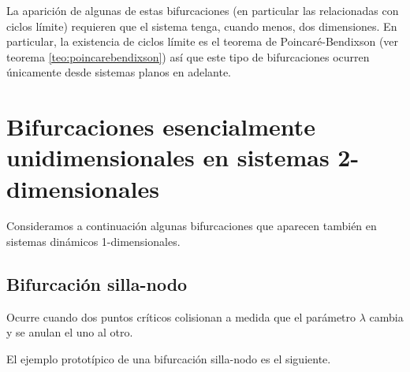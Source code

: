 La aparición de algunas de estas bifurcaciones (en particular las relacionadas con ciclos límite) requieren que el sistema tenga, cuando menos, dos dimensiones. En particular, la existencia de ciclos límite es el teorema de Poincaré-Bendixson (ver teorema \ref{teo:poincarebendixson}) así que este tipo de bifurcaciones ocurren únicamente desde sistemas planos en adelante.

\section{Bifurcaciones esencialmente unidimensionales en sistemas 2-dimensionales}

Consideramos a continuación algunas bifurcaciones que aparecen también en sistemas dinámicos 1-dimensionales.

\subsection{Bifurcación silla-nodo} \label{sec:bifurcacionsillanodo}
Ocurre cuando dos puntos críticos colisionan a medida que el parámetro $\lambda$ cambia y se anulan el uno al otro.

El ejemplo prototípico de una bifurcación silla-nodo es el siguiente.

